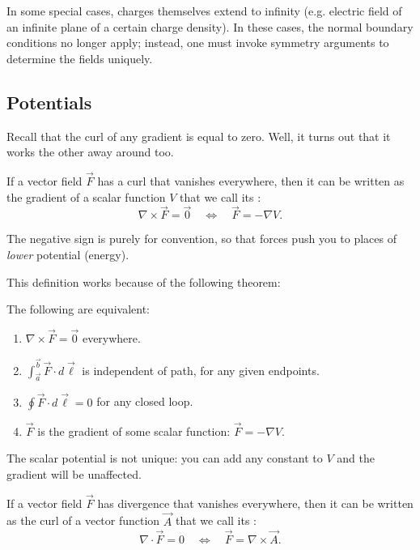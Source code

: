 \begin{remark}
In some special cases, charges themselves extend to infinity (e.g. electric field of an infinite plane of a certain charge density). In these cases, the normal boundary conditions no longer apply; instead, one must invoke symmetry arguments to determine the fields uniquely.
\end{remark}

\subsection{Potentials}

Recall that the curl of any gradient is equal to zero. Well, it turns out that it works the other away around too.

\begin{definition}
If a vector field $\vec{F}$ has a curl that vanishes everywhere, then it can be written as the gradient of a scalar function $V$ that we call its :
\[\nabla\times \vec{F}=\vec{0}\quad\Longleftrightarrow\quad \vec{F}=-\nabla V.\]
\end{definition}

\begin{remark}
The negative sign is purely for convention, so that forces push you to places of \textit{lower} potential (energy).
\end{remark}

This definition works because of the following theorem:

\begin{theorem}\label{irrotfields}
    The following are equivalent:
    \begin{enumerate}[(1)]
        \item $\nabla\times\vec{F}=\vec{0}$ everywhere.
        \item $\int_{\vec{a}}^{\vec{b}}\vec{F}\cdot d\vec{\ell}$ is independent of path, for any given endpoints.
        \item $\oint \vec{F}\cdot d\vec{\ell}=0$ for any closed loop.
        \item $\vec{F}$ is the gradient of some scalar function: $\vec{F}=-\nabla V$.
    \end{enumerate}
\end{theorem}

The scalar potential is not unique: you can add any constant to $V$ and the gradient will be unaffected.

\begin{definition}
If a vector field $\vec{F}$ has divergence that vanishes everywhere, then it can be written as the curl of a vector function $\vec{A}$ that we call its :
\[\nabla\cdot\vec{F}=0\quad\Longleftrightarrow\quad \vec{F}=\nabla\times\vec{A}.\]
\end{definition}

